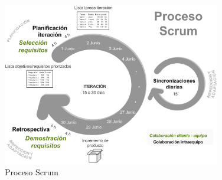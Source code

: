 \begin{figure}
  \centering
    \includegraphics[width=0.85\textwidth]{f2.png}
  \caption{Proceso Scrum}
  \label{figu1}
\end{figure}